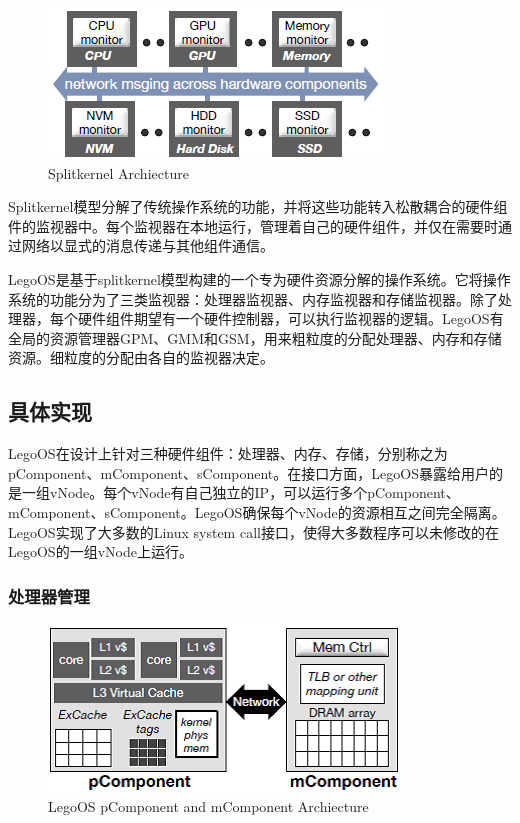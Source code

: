 \begin{figure}[h]
\centering
\includegraphics[scale=1.00]{Figures/legoos/splitkernel.png}
\decoRule
\caption{Splitkernel Archiecture}
\label{fig:legoos_archiecture}
\end{figure}

Splitkernel模型分解了传统操作系统的功能，并将这些功能转入松散耦合的硬件组件的监视器中。每个监视器在本地运行，管理着自己的硬件组件，并仅在需要时通过网络以显式的消息传递与其他组件通信。

LegoOS是基于splitkernel模型构建的一个专为硬件资源分解的操作系统。它将操作系统的功能分为了三类监视器：处理器监视器、内存监视器和存储监视器。除了处理器，每个硬件组件期望有一个硬件控制器，可以执行监视器的逻辑。LegoOS有全局的资源管理器GPM、GMM和GSM，用来粗粒度的分配处理器、内存和存储资源。细粒度的分配由各自的监视器决定。

\subsection{具体实现}

LegoOS在设计上针对三种硬件组件：处理器、内存、存储，分别称之为pComponent、mComponent、sComponent。在接口方面，LegoOS暴露给用户的是一组vNode。每个vNode有自己独立的IP，可以运行多个pComponent、mComponent、sComponent。LegoOS确保每个vNode的资源相互之间完全隔离。LegoOS实现了大多数的Linux system call接口，使得大多数程序可以未修改的在LegoOS的一组vNode上运行。

\subsubsection{处理器管理}

\begin{figure}[h]
\centering
\includegraphics[scale=1.00]{Figures/legoos/pcomponent_mcomponent.png}
\decoRule
\caption{LegoOS pComponent and mComponent Archiecture}
\label{fig:legoos_archiecture}
\end{figure}


